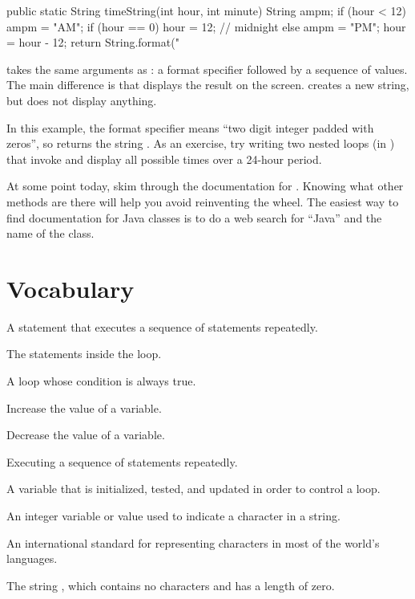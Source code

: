 \begin{code}
public static String timeString(int hour, int minute) {
    String ampm;
    if (hour < 12) {
        ampm = "AM";
        if (hour == 0) {
            hour = 12;  // midnight
        }
    } else {
        ampm = "PM";
        hour = hour - 12;
    }
    return String.format("%
}
\end{code}


 takes the same arguments as : a format specifier followed by a sequence of values.
The main difference is that  displays the result on the screen.
 creates a new string, but does not display anything.

In this example, the format specifier  means ``two digit integer padded with zeros'', so  returns the string .
As an exercise, try writing two nested  loops (in ) that invoke  and display all possible times over a 24-hour period.

At some point today, skim through the documentation for .
Knowing what other methods are there will help you avoid reinventing the wheel.
The easiest way to find documentation for Java classes is to do a web search for ``Java'' and the name of the class.


\section{Vocabulary}

\begin{description}

A statement that executes a sequence of statements repeatedly.

The statements inside the loop.

A loop whose condition is always true.

Increase the value of a variable.

Decrease the value of a variable.

Executing a sequence of statements repeatedly.

A variable that is initialized, tested, and updated in order to control a loop.

An integer variable or value used to indicate a character in a string.

An international standard for representing characters in most of the world's languages.

The string , which contains no characters and has a length of zero.

\end{description}


